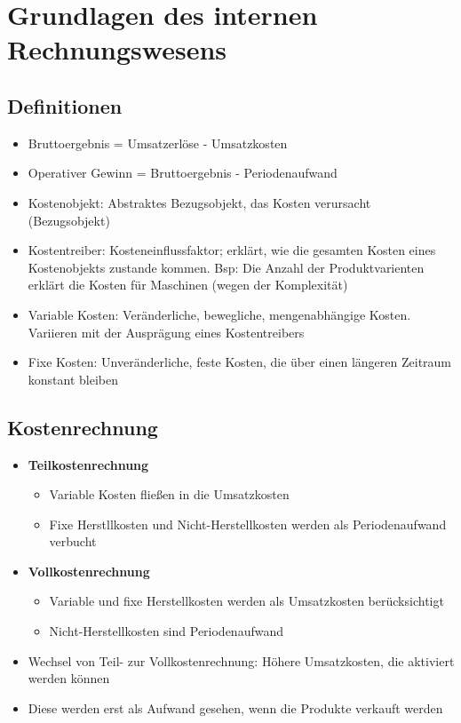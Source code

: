 \section{Grundlagen des internen Rechnungswesens}

\subsection{Definitionen}
\begin{itemize}
	\item Bruttoergebnis = Umsatzerlöse - Umsatzkosten
	\item Operativer Gewinn = Bruttoergebnis - Periodenaufwand
	\item Kostenobjekt: Abstraktes Bezugsobjekt, das Kosten verursacht (Bezugsobjekt)
	\item Kostentreiber: Kosteneinflussfaktor; erklärt, wie die gesamten Kosten eines Kostenobjekts zustande kommen. Bsp: Die Anzahl der Produktvarienten erklärt die Kosten für Maschinen (wegen der Komplexität)
	\item Variable Kosten: Veränderliche, bewegliche, mengenabhängige Kosten. Variieren mit der Ausprägung eines Kostentreibers
	\item Fixe Kosten: Unveränderliche, feste Kosten, die über einen längeren Zeitraum konstant bleiben
\end{itemize}


\subsection{Kostenrechnung}
\begin{itemize}
	\item \textbf{Teilkostenrechnung}
	\begin{itemize}
		\item Variable Kosten fließen in die Umsatzkosten
		\item Fixe Herstllkosten und Nicht-Herstellkosten werden als Periodenaufwand verbucht
	\end{itemize}
	\item \textbf{Vollkostenrechnung}
	\begin{itemize}
		\item Variable und fixe Herstellkosten werden als Umsatzkosten berücksichtigt
		\item Nicht-Herstellkosten sind Periodenaufwand
	\end{itemize}
	\item Wechsel von Teil- zur Vollkostenrechnung: Höhere Umsatzkosten, die aktiviert werden können
	\item Diese werden erst als Aufwand gesehen, wenn die Produkte verkauft werden
\end{itemize}


